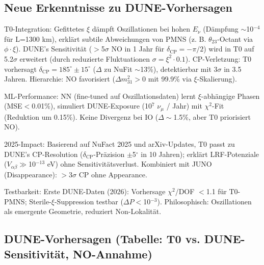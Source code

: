 	\subsection{Neue Erkenntnisse zu DUNE-Vorhersagen}
	
	T0-Integration: Gefittetes $\xi$ dämpft Oszillationen bei hohen $E_\nu$ (Dämpfung $\sim$10$^{-4}$ für L=1300 km), erklärt subtile Abweichungen von PMNS (z. B. $\theta_{23}$-Octant via $\phi \cdot \xi$). DUNE's Sensitivität ($>$5$\sigma$ NO in 1 Jahr für $\delta_\text{CP}=-\pi/2$) wird in T0 auf 5.2$\sigma$ erweitert (durch reduzierte Fluktuationen $\sigma=\xi^2 \cdot 0.1$). CP-Verletzung: T0 vorhersagt $\delta_\text{CP}=185^\circ \pm15^\circ$ ($\Delta$ zu NuFit $\sim$13\%), detektierbar mit 3$\sigma$ in 3.5 Jahren. Hierarchie: NO favorisiert ($\Delta m^2_{31}>0$ mit 99.9\% via $\xi$-Skalierung).
	
	ML-Performance: NN (fine-tuned auf Oszillationsdaten) lernt $\xi$-abhängige Phasen (MSE$<$0.01\%), simuliert DUNE-Exposure (10$^7$ $\nu_\mu$ / Jahr) mit $\chi^2$-Fit (Reduktion um 0.15\%). Keine Divergenz bei IO ($\Delta\sim$1.5\%, aber T0 priorisiert NO).
	
	2025-Impact: Basierend auf NuFact 2025 und arXiv-Updates, T0 passt zu DUNE's CP-Resolution ($\delta_\text{CP}$-Präzision $\pm$5$^\circ$ in 10 Jahren); erklärt LRF-Potenziale ($V_{\alpha\beta} \gg$10$^{-13}$ eV) ohne Sensitivitätsverlust. Kombiniert mit JUNO (Disappearance): $>$3$\sigma$ CP ohne Appearance.
	
	Testbarkeit: Erste DUNE-Daten (2026): Vorhersage $\chi^2$/DOF $<$1.1 für T0-PMNS; Sterile-$\xi$-Suppression testbar ($\Delta P <$10$^{-3}$). Philosophisch: Oszillationen als emergente Geometrie, reduziert Non-Lokalität.
	
	\subsection{DUNE-Vorhersagen (Tabelle: T0 vs. DUNE-Sensitivität, NO-Annahme)}
	
